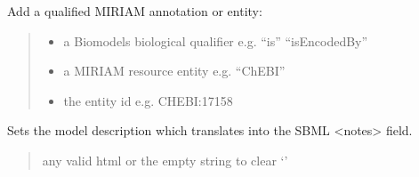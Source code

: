 \documentclass[letterpaper,12pt,english]{sphinxmanual}
\begin{document}
\begin{fulllineitems}
\begin{fulllineitems}
\begin{quote}
\begin{description}
\begin{itemize}
\end{itemize}

\end{description}\end{quote}

\end{fulllineitems}


\begin{fulllineitems}
\label{\detokenize{api/core:cbmpy.CBModel.Model.addMIRIAMannotation}}
\pysigstartsignatures
\pysiglinewithargsret
{}
{\sphinxparamcomma {}\sphinxparamcomma {}}
{}
\pysigstopsignatures
\sphinxAtStartPar
Add a qualified MIRIAM annotation or entity:
\begin{quote}\begin{description}
\begin{itemize}
\item {} 
\sphinxAtStartPar
{} \textendash{} a Biomodels biological qualifier e.g. “is” “isEncodedBy”

\item {} 
\sphinxAtStartPar
{} \textendash{} a MIRIAM resource entity e.g. “ChEBI”

\item {} 
\sphinxAtStartPar
{} \textendash{} the entity id e.g. CHEBI:17158

\end{itemize}

\end{description}\end{quote}

\end{fulllineitems}


\begin{fulllineitems}
\label{\detokenize{api/core:cbmpy.CBModel.Model.setDescription}}
\pysigstartsignatures
\pysiglinewithargsret
{}
{}
{}
\pysigstopsignatures
\sphinxAtStartPar
Sets the model description which translates into the SBML \textless{}notes\textgreater{} field.
\begin{quote}\begin{description}
\sphinxAtStartPar
{} \textendash{} any valid html or the empty string to clear ‘’


\end{description}
\end{quote}
\end{fulllineitems}
\end{fulllineitems}
\end{document}
